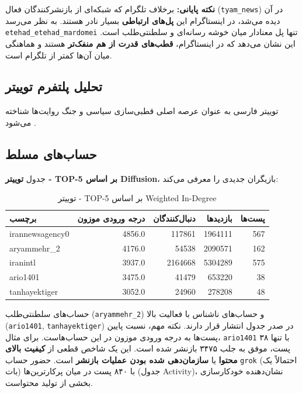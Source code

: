 \documentclass{article}
\begin{document}
	\textbf{نکته پایانی:} برخلاف تلگرام که شبکه‌ای از بازنشرکنندگان فعال (\texttt{tyam\_news}) در آن دیده می‌شد، در اینستاگرام این \textbf{پل‌های ارتباطی} بسیار نادر هستند. به نظر می‌رسد \texttt{etehad\_etehad\_mardomei} تنها پل معنادار میان خوشه رسانه‌ای و سلطنتی‌طلب است. این نشان می‌دهد که در اینستاگرام، \textbf{قطب‌های قدرت از هم منفک‌تر} هستند و هماهنگی میان آن‌ها کمتر از تلگرام است.
	

	\subsection{تحلیل پلتفرم توییتر}
	توییتر فارسی به عنوان عرصه اصلی قطبی‌سازی سیاسی و جنگ روایت‌ها شناخته می‌شود .
	
	\subsection{حساب‌های مسلط}
	جدول \textbf{توییتر - TOP-5 بر اساس Diffusion}، بازیگران جدیدی را معرفی می‌کند:
	
	\begin{longtable}{lrrrr}
		\caption{توییتر - TOP-5 بر اساس Weighted In-Degree} \\
		\toprule
		\textbf{برچسب} & \textbf{درجه ورودی موزون} & \textbf{دنبال‌کنندگان} & \textbf{بازدیدها} & \textbf{پست‌ها} \\
		\midrule
		irannewsagency0     & 4856.0 & 117861 & 1964111 & 567 \\
		aryammehr\_2         & 4176.0 & 54538  & 2090571 & 162 \\
		iranintl            & 3937.0 & 2164668 & 5304289 & 575 \\
		ario1401            & 3475.0 & 41479  & 653220  & 38 \\
		tanhayektiger       & 3052.0 & 24960  & 278208  & 48 \\
		\bottomrule	\end{longtable}
	

	حساب‌های سلطنتی‌طلب (\texttt{aryammehr\_2}) و حساب‌های ناشناس با فعالیت بالا (\texttt{ario1401}, \texttt{tanhayektiger}) در صدر جدول انتشار قرار دارند. نکته مهم، نسبت پایین پست‌ها به درجه ورودی موزون در این حساب‌هاست. برای مثال، \texttt{ario1401} با تنها ۳۸ پست، موفق به جلب ۳۴۷۵ بازنشر شده است. این یک شاخص قطعی از \textbf{کیفیت بالای محتوا} یا \textbf{سازمان‌دهی شده بودن عملیات بازنشر} است. حضور حساب \texttt{grok} (احتمالاً یک بات) با ۸۴۰ پست در میان پرکارترین‌ها (جدول Activity)، نشان‌دهنده خودکارسازی بخشی از تولید محتواست.
\end{document}
